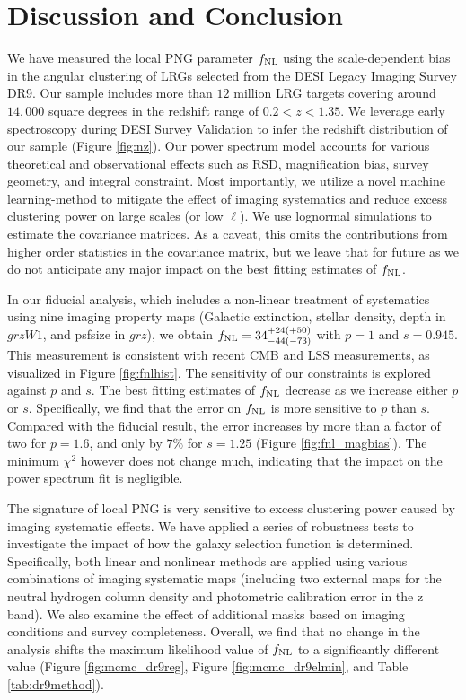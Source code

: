 \section{Discussion and Conclusion}\label{sec:conclusion}

We have measured the local PNG parameter $f_{\rm NL}$ using the scale-dependent bias in the angular clustering of LRGs selected from the DESI Legacy Imaging Survey DR9. Our sample includes more than $12$ million LRG targets covering around $14,000$ square degrees in the redshift range of $0.2< z < 1.35$. We leverage early spectroscopy during DESI Survey Validation \citep{desi2023sv} to infer the redshift distribution of our sample (Figure \ref{fig:nz}). Our power spectrum model accounts for various theoretical and observational effects such as RSD, magnification bias, survey geometry, and integral constraint. Most importantly, we utilize a novel machine learning-method to mitigate the effect of imaging systematics and reduce excess clustering power on large scales (or low $\ell$). We use lognormal simulations to estimate the covariance matrices. As a caveat, this omits the contributions from higher order statistics in the covariance matrix, but we leave that for future as we do not anticipate any major impact on the best fitting estimates of $f_{\rm NL}$.

In our fiducial analysis, which includes a non-linear treatment of systematics using nine imaging property maps (Galactic extinction, stellar density, depth in $grzW1$, and psfsize in $grz$), we obtain $f_{\rm NL} = 34^{+24(+50)}_{-44(-73)}$ with $p=1$ and $s=0.945$. This measurement is consistent with recent CMB and LSS measurements, as visualized in Figure \ref{fig:fnlhist}. The sensitivity of our constraints is explored against $p$ and $s$. The best fitting estimates of $f_{\rm NL}$ decrease as we increase either $p$ or $s$. Specifically, we find that the error on $f_{\rm NL}$ is more sensitive to $p$ than $s$. Compared with the fiducial result, the error increases by more than a factor of two for $p=1.6$, and only by $7\%$ for $s=1.25$ (Figure \ref{fig:fnl_magbias}). The minimum $\chi^{2}$ however does not change much, indicating that the impact on the power spectrum fit is negligible.

The signature of local PNG is very sensitive to excess clustering power caused by imaging systematic effects. We have applied a series of robustness tests to investigate the impact of how the galaxy selection function is determined. Specifically, both linear and nonlinear methods are applied using various combinations of imaging systematic maps (including two external maps for the neutral hydrogen column density and photometric calibration error in the z band). We also examine the effect of additional masks based on imaging conditions and survey completeness. Overall, we find that no change in the analysis shifts the maximum likelihood value of $f_{\rm NL}$ to a significantly different value (Figure \ref{fig:mcmc_dr9reg}, Figure \ref{fig:mcmc_dr9elmin}, and Table \ref{tab:dr9method}).

